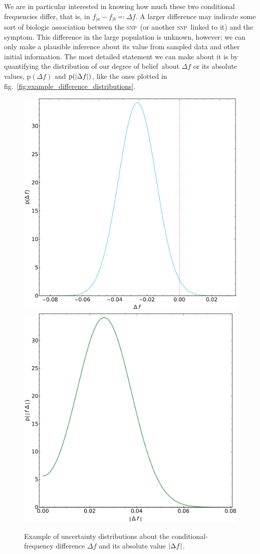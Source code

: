 \documentclass[\ifafour a4paper,12pt,\else a5paper,10pt,\fi%
onecolumn,oneside,article,%
british%
]{memoir}
\theoremstyle{remark}
\theoremstyle{innote}
\newcommand*{\defs}{\eqqcolon}
\DeclarePairedDelimiter\abs{\lvert}{\rvert}
\newcommand*{\pf}{\mathrm{p}}%
\renewcommand*{\|}[1][]{\nonscript\,#1\vert\nonscript\;\mathopen{}}
\newcommand*{\fig}{fig.}%
\newcommand*{\dob}{degree of belief}
\newcommand*{\snp}{\textsc{snp}}
\newcommand*{\ya}{a}
\newcommand*{\yb}{b}
\newcommand*{\df}{\Delta f}
\begin{document}
We are in particular interested in knowing how much these two conditional
frequencies differ, that is, in $f_{|\ya}-f_{|\yb} \defs \df$. A larger
difference may indicate some sort of biologic association between the \snp\
(or another \snp\ linked to it) and the symptom. This difference in the
large population is unknown, however; we can only make a plausible
inference about its value from sampled data and other initial information.
The most detailed statement we can make about it is by quantifying the
distribution of our \dob\ about $\df$ or its absolute values, $\pf(\df)$
and $\pf(\abs{\df})$, like the ones plotted in
\fig~\ref{fig:example_difference_distributions}.
\begin{figure}[t!]%
 \centering\includegraphics[width=0.49\linewidth]{example_diff.pdf}\includegraphics[width=0.49\linewidth]{example_absdiff.pdf}\\
 \caption{Example of uncertainty distributions about the
   conditional-frequency difference $\df$ and its absolute value
   $\abs{\df}$.}\label{fig:example_difference_distributions_old}
\end{figure}%
\end{document}
